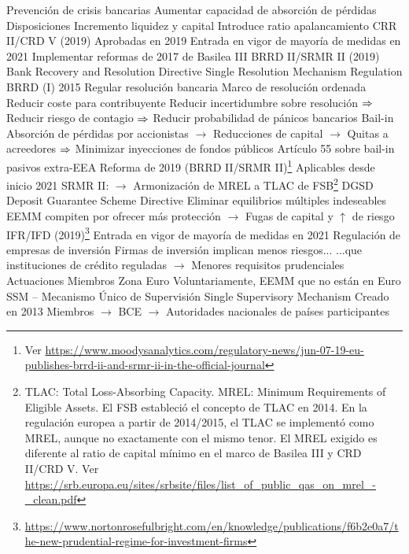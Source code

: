 \documentclass{nuevotema}
\begin{document}
\begin{esquemal}
				\4[] Prevención de crisis bancarias
				\4[] Aumentar capacidad de absorción de pérdidas
				\4 Disposiciones
				\4[] Incremento liquidez y capital
				\4[] Introduce ratio apalancamiento
			\3 CRR II/CRD V (2019)
				\4 Aprobadas en 2019
				\4 Entrada en vigor de mayoría de medidas en 2021
				\4 Implementar reformas de 2017 de Basilea III
			\3 BRRD II/SRMR II (2019)
				\4 Bank Recovery and Resolution Directive
				\4 Single Resolution Mechanism Regulation
				\4 BRRD (I) 2015
				\4 Regular resolución bancaria
				\4[] Marco de resolución ordenada
				\4[] Reducir coste para contribuyente
				\4[] Reducir incertidumbre sobre resolución
				\4[] $\Rightarrow$ Reducir riesgo de contagio
				\4[] $\Rightarrow$ Reducir probabilidad de pánicos bancarios
				\4 Bail-in
				\4[] Absorción de pérdidas por accionistas
				\4[] $\to$ Reducciones de capital
				\4[] $\to$ Quitas a acreedores
				\4[] $\Rightarrow$ Minimizar inyecciones de fondos públicos
				\4 Artículo 55 sobre bail-in pasivos extra-EEA
				\4 Reforma de 2019 (BRRD II/SRMR II)\footnote{Ver \url{https://www.moodysanalytics.com/regulatory-news/jun-07-19-eu-publishes-brrd-ii-and-srmr-ii-in-the-official-journal}}
				\4[] Aplicables desde inicio 2021
				\4[] SRMR II:
				\4[] $\to$ Armonización de MREL a TLAC de FSB\footnote{TLAC: Total Loss-Absorbing Capacity. MREL: Minimum Requirements of Eligible Assets. El FSB estableció el concepto de TLAC en 2014. En la regulación europea a partir de 2014/2015, el TLAC se implementó como MREL, aunque no exactamente con el mismo tenor. El MREL exigido es diferente al ratio de capital mínimo en el marco de Basilea III y CRD II/CRD V. Ver \url{https://srb.europa.eu/sites/srbsite/files/list_of_public_qas_on_mrel_-_clean.pdf}}
			\3 DGSD
				\4 Deposit Guarantee Scheme Directive
				\4 Eliminar equilibrios múltiples indeseables
				\4[] EEMM compiten por ofrecer más protección
				\4[] $\to$ Fugas de capital y $\uparrow$ de riesgo
			\3 IFR/IFD (2019)\footnote{\url{https://www.nortonrosefulbright.com/en/knowledge/publications/f6b2e0a7/the-new-prudential-regime-for-investment-firms}}
				\4 Entrada en vigor de mayoría de medidas en 2021
				\4 Regulación de empresas de inversión
				\4 Firmas de inversión implican menos riesgos...
				\4[] ...que instituciones de crédito reguladas
				\4[] $\to$ Menores requisitos prudenciales
		\2 Actuaciones
			\3 Miembros
				\4 Zona Euro
				\4 Voluntariamente, EEMM que no están en Euro
			\3 SSM -- Mecanismo Único de Supervisión
				\4 Single Supervisory Mechanism
				\4 Creado en 2013
				\4 Miembros
				\4[] $\to$ BCE
				\4[] $\to$ Autoridades nacionales de países participantes

\end{esquemal}
\end{document}
